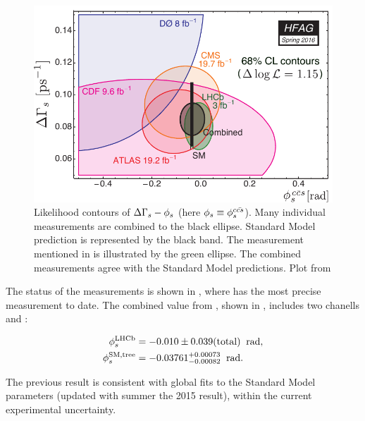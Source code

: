 \begin{figure}[h]
  \centering
    \includegraphics[trim=0cm 0cm 0cm 0cm, clip=true, scale=0.8]{Figures/Chapter1/hfag_Spring2016_DGsphis_zoom.pdf}
    \caption{Likelihood contours of $\Delta\Gamma_s-\phi_{s}$ (here $\phi_{s}\equiv \phi_{s}^{c\bar{cs}}$). Many individual measurements are
             combined to the black ellipse. Standard Model prediction is represented by the black band. The \lhcb measurement
             mentioned in  is illustrated by the green ellipse. The combined measurements agree with the Standard Model
             predictions. Plot from \cite{hfag-2014} }
    \label{hfag_phis_dg}
\end{figure}

The status of the \phis measurements is shown in , where \lhcb has the most precise measurement to date.
The combined \phis value from \lhcb \cite{phis-3fb-paper}, shown in , includes two chanells \BsJpsiPhi and \BsJpsipipi:

\begin{subequations}
  \label{phis_lhcb_theo}
  \begin{align}
  \centering
  \phiS{\lhcb}           &=  -0.010 \pm 0.039(\text{total})  \;\; \text{rad},
  \label{phis_lhcb}\\
  \phiS{SM,tree}  &= -0.03761 {}^{+0.00073}_{-0.00082}  \;\; \text{rad}.
  \label{phis_theo}
\end{align}
\end{subequations}

\noindent The previous result is consistent with global fits to the Standard Model parameters
 \cite{ckm-fitter-phis-pred} (updated with summer the 2015 result), within the current experimental uncertainty.

